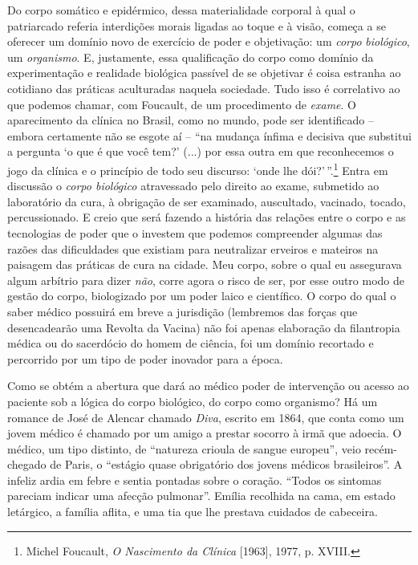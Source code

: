 Do corpo somático e epidérmico, dessa materialidade corporal à qual o
patriarcado referia interdições morais ligadas ao toque e à visão,
começa a se oferecer um domínio novo de exercício de poder e
objetivação: um \emph{corpo} \emph{biológico}, um \emph{organismo}. E,
justamente, essa qualificação do corpo como domínio da experimentação e
realidade biológica passível de se objetivar é coisa estranha ao
cotidiano das práticas aculturadas naquela sociedade. Tudo isso é
correlativo ao que podemos chamar, com Foucault, de um procedimento de
\emph{exame}. O aparecimento da clínica no Brasil, como no mundo, pode
ser identificado -- embora certamente não se esgote aí -- ``na mudança
ínfima e decisiva que substitui a pergunta `o que é que você tem?' (...)
por essa outra em que reconhecemos o jogo da clínica e o princípio de
todo seu discurso: `onde lhe dói?'\,''.\footnote{Michel Foucault,
  \emph{O Nascimento da Clínica} {[}1963{]}, 1977, p. XVIII.} Entra em
discussão o \emph{corpo biológico} atravessado pelo direito ao exame,
submetido ao laboratório da cura, à obrigação de ser examinado,
auscultado, vacinado, tocado, percussionado. E creio que será fazendo a
história das relações entre o corpo e as tecnologias de poder que o
investem que podemos compreender algumas das razões das dificuldades que
existiam para neutralizar erveiros e mateiros na paisagem das práticas
de cura na cidade. Meu corpo, sobre o qual eu assegurava algum arbítrio
para dizer \emph{não}, corre agora o risco de ser, por esse outro modo
de gestão do corpo, biologizado por um poder laico e científico. O corpo
do qual o saber médico possuirá em breve a jurisdição (lembremos das
forças que desencadearão uma Revolta da Vacina) não foi apenas
elaboração da filantropia médica ou do sacerdócio do homem de ciência,
foi um domínio recortado e percorrido por um tipo de poder inovador para
a época.

Como se obtém a abertura que dará ao médico poder de intervenção ou
acesso ao paciente sob a lógica do corpo biológico, do corpo como
organismo? Há um romance de José de Alencar chamado \emph{Diva}, escrito
em 1864, que conta como um jovem médico é chamado por um amigo a prestar
socorro à irmã que adoecia. O médico, um tipo distinto, de ``natureza
crioula de sangue europeu'', veio recém-chegado de Paris, o ``estágio
quase obrigatório dos jovens médicos brasileiros''. A infeliz ardia em
febre e sentia pontadas sobre o coração. ``Todos os sintomas pareciam
indicar uma afecção pulmonar''. Emília recolhida na cama, em estado
letárgico, a família aflita, e uma tia que lhe prestava cuidados de
cabeceira.


